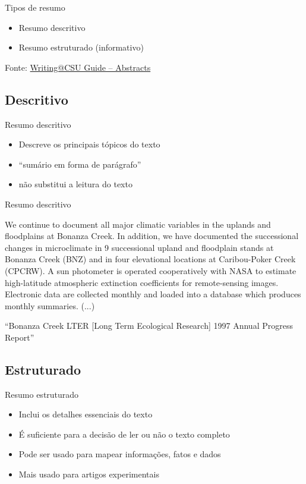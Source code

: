 \documentclass{beamer}
\begin{document}
\begin{frame}{Tipos de resumo}
  \begin{itemize}
  \item Resumo descritivo
  \item Resumo estruturado (informativo)
  \end{itemize}

  \vfill
  \scriptsize
  \hfill Fonte: \href{https://writing.colostate.edu/guides/guide.cfm?guideid=59}{Writing@CSU Guide -- Abstracts}
\end{frame}

\subsection{Descritivo}

\begin{frame}{Resumo descritivo}
  \begin{itemize}
  \item Descreve os principais tópicos do texto
  \item ``sumário em forma de parágrafo''
  \item não substitui a leitura do texto
  \end{itemize}
\end{frame}

\begin{frame}{Resumo descritivo}
  \begin{example}
    We continue to document all major climatic variables in the
    uplands and floodplains at Bonanza Creek. In addition, we have
    documented the successional changes in microclimate in 9
    successional upland and floodplain stands at Bonanza Creek (BNZ)
    and in four elevational locations at Caribou-Poker Creek
    (CPCRW). A sun photometer is operated cooperatively with NASA to
    estimate high-latitude atmospheric extinction coefficients for
    remote-sensing images. Electronic data are collected monthly and
    loaded into a database which produces monthly summaries.  (...)
  \end{example}
  ``Bonanza Creek LTER [Long Term Ecological Research] 1997 Annual
  Progress Report''
\end{frame}

\subsection{Estruturado}

\begin{frame}{Resumo estruturado}
  \begin{itemize}
  \item Inclui os detalhes essenciais do texto
  \item É suficiente para a decisão de ler ou não o texto completo
  \item Pode ser usado para mapear informações, fatos e dados
  \item Mais usado para artigos experimentais
  \end{itemize}
\end{frame}
\end{document}
